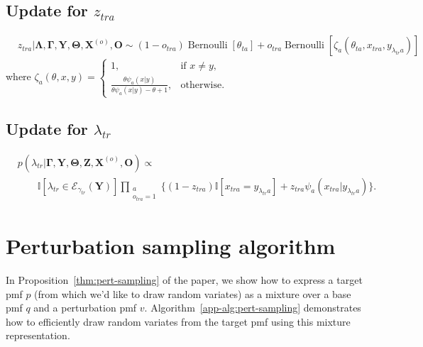 \documentclass[12pt,letterpaper]{article}
\renewcommand\vec{\bm}
\newcommand{\partset}{\mathcal{E}} %
\newcommand{\1}[1]{\mathbb{I}\!\left[#1\right]} %
\begin{document}
\subsection{Update for \texorpdfstring{$z_{tra}$}{distortion indicators}}
\begin{equation}
  \begin{split}
  & z_{tra}|\vec{\Lambda}, \vec{\Gamma}, \vec{Y}, \vec{\Theta}, \vec{X}^{(o)}, \vec{O} \sim 
      (1-o_{tra}) \operatorname{Bernoulli}[\theta_{ta}] +
      o_{tra} \operatorname{Bernoulli}[\zeta_a(\theta_{ta}, x_{tra}, y_{\lambda_{tr}a})]
  \end{split}
  \label{app-eqn:z-update}
\end{equation}
where
$\zeta_a(\theta, x, y) = \begin{cases}
    1, & \text{if } x \neq y, \\
    \frac{\theta \psi_{a}(x|y)}{\theta \psi_{a}(x|y) - \theta + 1}, &\text{otherwise.}
  \end{cases}$

\subsection{Update for \texorpdfstring{$\lambda_{tr}$}{entity assignments}}
\begin{equation}
\begin{split}
& p(\lambda_{tr} | \vec{\Gamma}, \vec{Y}, \vec{\Theta}, \vec{Z}, \vec{X}^{(o)}, \vec{O}) \propto \\
& \qquad \1{\lambda_{tr} \in \partset_{\gamma_{tr}}(\vec{Y})} 
\prod_{\substack{a\\o_{tra}=1}} \Big\{ (1 - z_{tra}) \1{x_{tra} = y_{\lambda_{tr}a}} + z_{tra} \psi_{a}(x_{tra}|y_{\lambda_{tr}a})\Big\}.
\end{split}
\label{app-eqn:lambda-update}
\end{equation}

\section{Perturbation sampling algorithm}
\label{app-sec:pert-sampling}
In Proposition~\ref{thm:pert-sampling} of the paper, we show how to express a 
target pmf $p$ (from which we'd like to draw random variates) as a mixture over 
a base pmf $q$ and a perturbation pmf $v$.
Algorithm~\ref{app-alg:pert-sampling} demonstrates how to efficiently 
draw random variates from the target pmf using this mixture representation.
\end{document}
